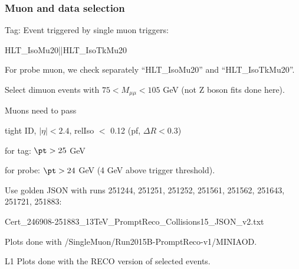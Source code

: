 \begin{frame}[fragile=singleslide]
\frametitle{Muon and data selection}
\label{slide:evtsel}
\bi
\item Tag: Event triggered by single muon triggers:
\begin{verbatim*}
HLT_IsoMu20||HLT_IsoTkMu20
\end{verbatim*}
\item For probe muon, we check separately ``HLT\_IsoMu20'' and ``HLT\_IsoTkMu20''.
\item Select dimuon events with $75<M_{\mu\mu}<105$ GeV (not Z boson fits done here).
\item Muons need to pass
	\bi
	\item tight ID, $|\eta|<2.4$, relIso $<$ 0.12 (pf, $\Delta R<0.3$)
	\item for tag: $\pt>25$ GeV
	\item for probe: $\pt > 24$ GeV (4 GeV above trigger threshold).
	\ei
\emptyitemspace
\item Use golden JSON with runs 251244, 251251, 251252, 251561, 251562, 251643, 251721, 251883:
\begin{verbatim*}
Cert_246908-251883_13TeV_PromptReco_Collisions15_JSON_v2.txt
\end{verbatim*}
\item Plots done with /SingleMuon/Run2015B-PromptReco-v1/MINIAOD.
\item L1 Plots done with the RECO version of selected events.
\ei
\end{frame}


